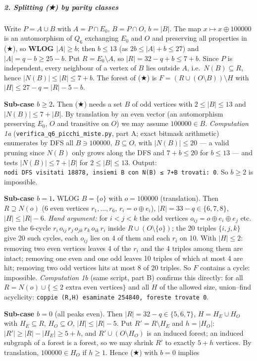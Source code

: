 \subparagraph{2. Splitting (★) by parity
classes}\label{splitting-by-parity-classes}

Write \(P=A\cup B\) with \(A=P\cap E_0\), \(B=P\cap O\), \(b=|B|\). The
map \(x\mapsto x\oplus 100000\) is an automorphism of \(Q_6\) exchanging
\(E_0\) and \(O\) and preserving all properties in (★), so \textbf{WLOG
\(|A|\ge b\)}; then \(b\le13\) (as \(2b\le|A|+b\le27\)) and
\(|A|=q-b\ge25-b\). Put \(R=E_0\setminus A\), so \(|R|=32-q+b\le7+b\).
Since \(P\) is independent, every neighbour of a vertex of \(B\) lies
outside \(A\), i.e.~\(N(B)\subseteq R\), hence \(|N(B)|\le|R|\le7+b\).
The forest of (★) is \(F=(R\cup(O\setminus B))\setminus H\) with
\(|H|\le27-q=|R|-5-b\).

\textbf{Sub-case \(b\ge2\).} Then (★) needs a set \(B\) of odd vertices
with \(2\le|B|\le13\) and \(|N(B)|\le7+|B|\). By translation by an even
vector (an automorphism preserving \(E_0\), \(O\) and transitive on
\(O\)) we may assume \(100000\in B\). \emph{Computation 1a}
(\texttt{verifica\_q6\_picchi\_miste.py}, part A; exact bitmask
arithmetic) enumerates by DFS all \(B\ni100000\), \(B\subseteq O\), with
\(|N(B)|\le20\) --- a valid pruning since \(N(B)\) only grows along the
DFS and \(7+b\le20\) for \(b\le13\) --- and tests \(|N(B)|\le7+|B|\) for
\(2\le|B|\le13\). Output:
\texttt{nodi\ DFS\ visitati\ 18878,\ insiemi\ B\ con\ \textbar{}N(B)\textbar{}\ ≤\ 7+\textbar{}B\textbar{}\ trovati:\ 0}.
So \(b\ge2\) is impossible.

\textbf{Sub-case \(b=1\).} WLOG \(B=\{o\}\) with \(o=100000\)
(translation). Then \(R\supseteq N(o)\) (6 even vertices
\(r_1,\dots,r_6\), \(r_i=o\oplus e_i\)), \(|R|=33-q\in\{6,7,8\}\),
\(|H|\le|R|-6\). \emph{Hand argument:} for \(i<j<k\) the odd vertices
\(o_{ij}=o\oplus e_i\oplus e_j\) etc. give the 6-cycle
\(r_i\,o_{ij}\,r_j\,o_{jk}\,r_k\,o_{ik}\,r_i\) inside
\(R\cup(O\setminus\{o\})\); the 20 triples \(\{i,j,k\}\) give 20 such
cycles, each \(o_{ij}\) lies on 4 of them and each \(r_i\) on 10. With
\(|H|\le2\): removing two even vertices leaves 4 of the \(r_i\) and the
4 triples among them are intact; removing one even and one odd leaves 10
triples of which at most 4 are hit; removing two odd vertices hits at
most 8 of 20 triples. So \(F\) contains a cycle: impossible.
\emph{Computation 1b} (same script, part B) confirms this directly: for
all \(R=N(o)\cup\{\le2\text{ extra even vertices}\}\) and all \(H\) of
the allowed size, union--find acyclicity:
\texttt{coppie\ (R,H)\ esaminate\ 254840,\ foreste\ trovate\ 0}.

\textbf{Sub-case \(b=0\)} (all peaks even). Then
\(|R|=32-q\in\{5,6,7\}\), \(H=H_E\cup H_O\) with \(H_E\subseteq R\),
\(H_O\subseteq O\), \(|H|\le|R|-5\). Put \(R'=R\setminus H_E\) and
\(h=|H_O|\): \(|R'|\ge|R|-|H_E|\ge5+h\), and \(R'\cup(O\setminus H_O)\)
is an induced forest; an induced subgraph of a forest is a forest, so we
may shrink \(R'\) to exactly \(5+h\) vertices. By translation,
\(100000\in H_O\) if \(h\ge1\). Hence (★) with \(b=0\) implies

